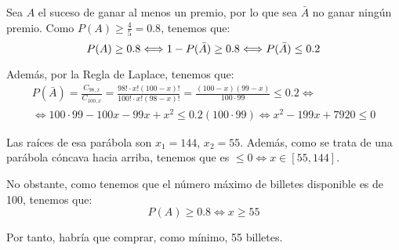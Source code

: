 \begin{ejercicio}
\begin{enumerate}
        Sea $A$ el suceso de ganar al menos un premio, por lo que sea $\bar{A}$ no ganar ningún premio. Como $P(A)\geq \frac{4}{5}=0.8$, tenemos que:
        \begin{equation*}
            P(A)\geq 0.8 \Longleftrightarrow 1-P(\bar{A}) \geq 0.8 \Longleftrightarrow P(\Bar{A})\leq 0.2
        \end{equation*}

        Además, por la Regla de Laplace, tenemos que:
        \begin{multline*}
            P(\bar{A})=\frac{C_{98,x}}{C_{100,x}} = \frac{98! \cdot x!(100-x)!}{100!\cdot x!(98-x)!}
            = \frac{(100-x)(99-x)}{100\cdot 99} \leq 0.2
            \Longleftrightarrow \\ \Longleftrightarrow
            100\cdot 99 -100x-99x+x^2 \leq 0.2(100\cdot 99)
            \Longleftrightarrow x^2-199x+7920\leq 0
        \end{multline*}

        Las raíces de esa parábola son $x_1=144$, $x_2=55$. Además, como se trata de una parábola cóncava hacia arriba, tenemos que es $\leq 0 \Longleftrightarrow x\in [55,144]$.

        No obstante, como tenemos que el número máximo de billetes disponible es de 100, tenemos que:
        \begin{equation*}
            P(A)\geq 0.8 \Longleftrightarrow x\geq 55
        \end{equation*}

        Por tanto, habría que comprar, como mínimo, 55 billetes.
    \end{enumerate}
\end{ejercicio}

